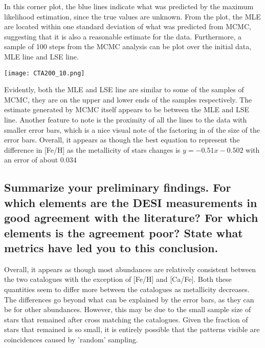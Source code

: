 \documentclass{article}
\begin{document}
In this corner plot, the blue lines indicate what was predicted by the maximum likelihood estimation, since the true values are unknown. From the plot, the MLE are located within one standard deviation of what was predicted from MCMC, suggesting that it is also a reasonable estimate for the data. Furthermore, a sample of 100 steps from the MCMC analysis can be plot over the initial data, MLE line and LSE line. 
\bigskip\noindent

\texttt{[image: CTA200\_10.png]}
\bigskip\noindent

Evidently, both the MLE and LSE line are similar to some of the samples of MCMC, they are on the upper and lower ends of the samples respectively. The estimate generated by MCMC itself appears to be between the MLE and LSE line. Another feature to note is the proximity of all the lines to the data with smaller error bars, which is a nice visual note of the factoring in of the size of the error bars. Overall, it appears as though the best equation to represent the difference in [Fe/H] as the metallicity of stars changes is $y = -0.51x -0.502$ with an error of about 0.034

\subsection{Summarize your preliminary findings. For which elements are the DESI measurements in good agreement with the literature? For which elements is the agreement poor? State what metrics have led you to this conclusion.}
Overall, it appears as though most abundances are relatively consistent between the two catalogues with the exception of [Fe/H] and [Ca/Fe]. Both these quantities seem to differ more between the catalogues as metallicity decreases. The differences go beyond what can be explained by the error bars, as they can be for other abundances. However, this may be due to the small sample size of stars that remained after cross matching the catalogues. Given the fraction of stars that remained is so small, it is entirely possible that the patterns visible are coincidences caused by 'random' sampling. 
\end{document}
